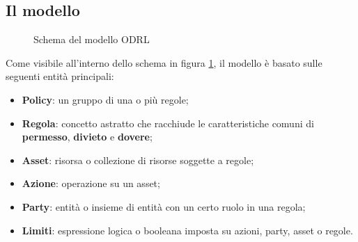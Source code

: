 \documentclass[12pt,a4paper,twoside]{book}
\begin{document}
\subsection{Il modello}\label{modello}
\begin{figure}[H]
	\centering
	\def\svgwidth{\columnwidth}
	
	\caption{Schema del modello ODRL\cite{ODRLinfMod}\label{ODRLModelSchema}}
\end{figure}
Come visibile all'interno dello schema in figura \ref{ODRLModelSchema}, il modello è basato sulle seguenti entità principali:
\begin{itemize}
	\item \textbf{Policy}: un gruppo di una o più regole;
	\item \textbf{Regola}: concetto astratto che racchiude le caratteristiche comuni di \textbf{permesso}, \textbf{divieto} e \textbf{dovere};
	\item \textbf{Asset}: risorsa o collezione di risorse soggette a regole;
	\item \textbf{Azione}: operazione su un asset;
	\item \textbf{Party}: entità o insieme di entità con un certo ruolo in una regola;
	\item \textbf{Limiti}: espressione logica o booleana imposta su azioni, party, asset o regole.
\end{itemize}
\end{document}
